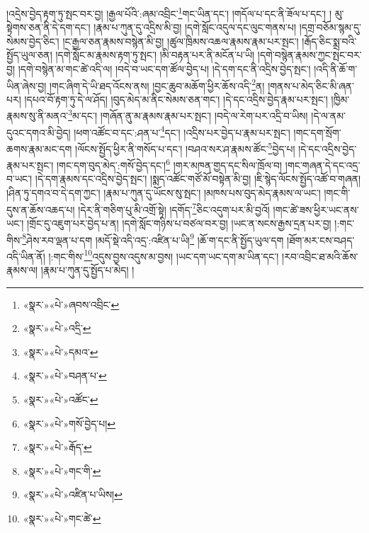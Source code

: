 །འདྲེས་བྱེད་རྟག་ཏུ་སྤང་བར་བྱ། །རྒྱལ་པོའི་:ཞམ་འབྲིང་\footnote{«སྣར་»«པེ་»ཞབས་འབྲིང་}གང་ཡིན་དང་། །གདོལ་པ་དང་ནི་ཟོལ་པ་དང་། །
མུ་སྟེགས་ཅན་ནི་དེ་དག་དང་། །རྣམ་པ་ཀུན་དུ་འདྲིས་མི་བྱ། །དགེ་སློང་འདུལ་དང་ལུང་གནས་པ། །དགྲ་བཅོམ་སྙམ་དུ་སེམས་བྱེད་ཅིང་། །ང་རྒྱལ་ཅན་རྣམས་བསྙེན་མི་བྱ། །ཚུལ་ཁྲིམས་འཆལ་རྣམས་རྣམ་པར་སྤང་། །རྒོད་ཅིང་སྨྲ་བའི་སྤྱོད་ཡུལ་ཅན། །དགེ་སློང་མ་རྣམས་རྟག་ཏུ་སྤང་། །མི་བརྟན་པར་ནི་མངོན་པ་ཡི། །དགེ་བསྙེན་རྣམས་ཀྱང་སྤང་བར་བྱ། །དགེ་བསྙེན་མ་གང་ཚེ་འདི་ལ། །བདེ་བ་ཡང་དག་ཚོལ་བྱེད་པ། །དེ་དག་དང་ནི་འདྲིས་བྱེད་སྤང་། །འདི་ནི་ཆོ་ག་ཡིན་ཞེས་བྱ། །གང་ཞིག་དེ་ཡི་ཐད་འོངས་ནས། །བྱང་ཆུབ་མཆོག་ཕྱིར་ཆོས་འདི་\footnote{«སྣར་»«པེ་»འདྲི་}ན། །གནས་པ་མེད་ཅིང་མི་ཞན་པར། །དཔའ་བོ་རྟག་ཏུ་དེ་ལ་ཤོད། །བུད་མེད་མ་ནིང་སེམས་ཅན་གང་། །དེ་དང་འདྲིས་བྱེད་རྣམ་པར་སྤང་། །ཁྱིམ་རྣམས་སུ་ནི་མནའ་\footnote{«སྣར་»«པེ་»དམའ་}མ་དང་། །གཞོན་ནུ་མ་རྣམས་རྣམ་པར་སྤང་། །བདེ་ལ་རེག་པར་འདྲི་བ་ཡིས། །དེ་ལ་ནམ་དུའང་དགའ་མི་བྱེད། །ཕག་འཚོང་བ་དང་:ཤན་པ་\footnote{«སྣར་»«པེ་»བཤན་པ་}དང་། །འདྲིས་པར་བྱེད་པ་རྣམ་པར་སྤང་། །གང་དག་སྲོག་ཆགས་རྣམ་མང་དག །ལོངས་སྤྱོད་ཕྱིར་ནི་གསོད་པ་དང་། །བཤའ་སར་ཤ་རྣམས་ཚོང་\footnote{«སྣར་»«པེ་»འཚོང་}བྱེད་པ། །དེ་དང་འདྲིས་བྱེད་རྣམ་པར་སྤང་། །གང་དག་བུད་མེད་:གསོ་བྱེད་དང་།\footnote{«སྣར་»«པེ་»གསོ་བྱེད་པ།} །གར་མཁན་གྱད་དང་སིལ་ཁྲོལ་བ། །གང་གཞན་དེ་དང་འདྲ་བ་ཡང་། །དེ་དག་རྣམས་དང་འདྲིས་བྱེད་སྤང་། །སྨད་འཚོང་གཙོ་མོ་བསྟེན་མི་བྱ། །ཇི་སྙེད་ལོངས་སྤྱོད་འཚོ་བ་གཞན། །ཤིན་ཏུ་དགའ་བ་དེ་དག་ཀྱང་། །རྣམ་པ་ཀུན་དུ་ཡོངས་སུ་སྤང་། །མཁས་པས་བུད་མེད་རྣམས་ལ་ཡང་། །གང་གི་དུས་ན་ཆོས་འཆད་པ། །དེར་ནི་གཅིག་པུ་མི་འགྲོ་སྟེ། །དགོད་\footnote{«སྣར་»«པེ་»རྒོད་}ཅིང་འདུག་པར་མི་བྱའོ། །གང་ཚེ་ཟས་ཕྱིར་ཡང་ནས་ཡང་། །གྲོང་དུ་འཇུག་པར་བྱེད་པ་ན། །དགེ་སློང་གཉིས་པ་བཙལ་བར་བྱ། །ཡང་ན་སངས་རྒྱས་དྲན་པར་བྱ། །:གང་གིས་\footnote{«སྣར་»«པེ་»གང་གི་}ཤེས་རབ་ལྡན་པ་དག །མདོ་སྡེ་འདི་འདྲ་:འཛིན་པ་ཡི།\footnote{«སྣར་»«པེ་»འཛིན་པ་ཡིས།} །ཆོ་ག་དང་ནི་སྤྱོད་ཡུལ་དག །ཐོག་མར་ངས་བཤད་འདི་ཡིན་ནོ། །:གང་གིས་\footnote{«སྣར་»«པེ་»གང་ཚེ་}འདུས་བྱས་འདུས་མ་བྱས། །ཡང་དག་ཡང་དག་མ་ཡིན་དང་། །རབ་འབྲིང་ཐ་མའི་ཆོས་རྣམས་ལ། །རྣམ་པ་ཀུན་དུ་སྤྱོད་པ་མེད། །

